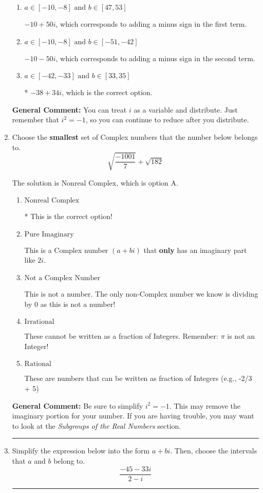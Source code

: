 \documentclass{extbook}[14pt]
\newcommand{\litem}[1]{\item #1

\rule{\textwidth}{0.4pt}}
\begin{document}
\begin{enumerate}
{\begin{enumerate}[label=\Alph*.]
 $-24 + 14 i$, which corresponds to just multiplying the real terms to get the real part of the solution and the coefficients in the complex terms to get the complex part.
\item \( a \in [-10, -8] \text{ and } b \in [47, 53] \)

 $-10 + 50 i$, which corresponds to adding a minus sign in the first term.
\item \( a \in [-10, -8] \text{ and } b \in [-51, -42] \)

 $-10 - 50 i$, which corresponds to adding a minus sign in the second term.
\item \( a \in [-42, -33] \text{ and } b \in [33, 35] \)

* $-38 + 34 i$, which is the correct option.
\end{enumerate}

\textbf{General Comment:} You can treat $i$ as a variable and distribute. Just remember that $i^2=-1$, so you can continue to reduce after you distribute.
}
\litem{
Choose the \textbf{smallest} set of Complex numbers that the number below belongs to.
\[ \sqrt{\frac{-1001}{7}}+\sqrt{182} \]

The solution is \( \text{Nonreal Complex} \), which is option A.\begin{enumerate}[label=\Alph*.]
\item \( \text{Nonreal Complex} \)

* This is the correct option!
\item \( \text{Pure Imaginary} \)

This is a Complex number $(a+bi)$ that \textbf{only} has an imaginary part like $2i$.
\item \( \text{Not a Complex Number} \)

This is not a number. The only non-Complex number we know is dividing by 0 as this is not a number!
\item \( \text{Irrational} \)

These cannot be written as a fraction of Integers. Remember: $\pi$ is not an Integer!
\item \( \text{Rational} \)

These are numbers that can be written as fraction of Integers (e.g., -2/3 + 5)
\end{enumerate}

\textbf{General Comment:} Be sure to simplify $i^2 = -1$. This may remove the imaginary portion for your number. If you are having trouble, you may want to look at the \textit{Subgroups of the Real Numbers} section.
}
\litem{
Simplify the expression below into the form $a+bi$. Then, choose the intervals that $a$ and $b$ belong to.
\[ \frac{-45 - 33 i}{2 - i} \]

}
\end{enumerate}
\end{document}
